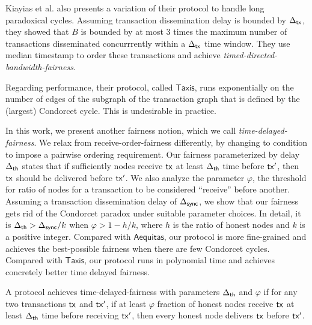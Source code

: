 Kiayias et al. \cite{DBLP:conf/eurocrypt/KiayiasLS24} also presents a variation of their protocol to handle long paradoxical cycles. Assuming transaction dissemination delay is bounded by $\Delta_{\mathsf{tx}}$, they showed that $B$ is bounded by at most $3$ times the maximum number of transactions disseminated concurrrently within a $\Delta_{\mathsf{tx}}$ time window. They use median timestamp to order these transactions and achieve \textit{timed-directed-bandwidth-fairness}. 

Regarding performance, their protocol, called $\mathsf{Taxis}$, runs exponentially on the number of edges of the subgraph of the transaction graph that is defined by the (largest) Condorcet cycle. This is undesirable in practice. 


In this work, we present another fairness notion, which we call \textit{time-delayed-fairness}. We relax from receive-order-fairness differently, by changing to condition to impose a pairwise ordering requirement. Our fairness parameterized by delay $\Delta_{\mathsf{th}}$ states that if sufficiently nodes receive $\mathsf{tx}$ at least $\Delta_{\mathsf{th}}$ time before $\mathsf{tx}'$, then $\mathsf{tx}$ should be delivered before $\mathsf{tx}'$. We also analyze the parameter $\varphi$, the threshold for ratio of nodes for a transaction to be considered ``receive'' before another. Assuming a transaction dissemination delay of $\Delta_{\mathsf{sync}}$, we show that our fairness gets rid of the Condorcet paradox under suitable parameter choices. In detail, it is $\Delta_{\mathsf{th}}>\Delta_{\mathsf{sync}}/k$ when $\varphi>1-h/k$, where $h$ is the ratio of honest nodes and $k$ is a positive integer. Compared with $\mathsf{Aequitas}$, our protocol is more fine-grained and achieves the best-possible fairness when there are few Condorcet cycles. Compared with $\mathsf{Taxis}$, our protocol runs in polynomial time and achieves concretely better time delayed fairness. 



\begin{definition}\label{def:timed-fairness}
    A protocol achieves time-delayed-fairness with parameters $\Delta_{\mathsf{th}}$ and $\varphi$ if for any two transactions $\mathsf{tx}$ and $\mathsf{tx}'$, if at least $\varphi$ fraction of honest nodes receive $\mathsf{tx}$ at least $\Delta_{\mathsf{th}}$ time before receiving $\mathsf{tx}'$, then every honest node delivers $\mathsf{tx}$ before $\mathsf{tx}'$.
\end{definition}
